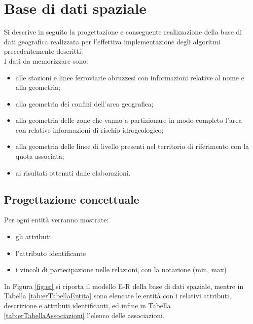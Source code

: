\section{Base di dati spaziale}
Si descrive in seguito la progettazione e conseguente realizzazione della base di dati geografica realizzata per l'effettiva implementazione degli algoritmi precedentemente descritti.\\
I dati da memorizzare sono: 
\begin{itemize}
\item alle stazioni e linee ferroviarie abruzzesi con informazioni relative al nome e alla geometria;
\item alla geometria dei confini dell'area geografica;
\item alla geometria delle zone che vanno a partizionare in modo completo l'area con relative informazioni di rischio idrogeologico;
\item alla geometria delle linee di livello presenti nel territorio di riferimento con la quota associata;
\item ai risultati ottenuti dalle elaborazioni.
\end{itemize}

 

\subsection{Progettazione concettuale}
Per ogni entità verranno mostrate:

\begin{itemize}
\item gli attributi
\item l'attributo identificante
\item i vincoli di partecipazione nelle relazioni, con la notazione (min, max)
\end{itemize}

In Figura \ref{fig:er} si riporta il modello E-R della base di dati spaziale, mentre in Tabella \ref{tab:erTabellaEntita} sono elencate le entità con i relativi attributi, descrizione e attributi identificanti, ed infine in Tabella \ref{tab:erTabellaAssociazioni} l’elenco delle associazioni.
\pagebreak

